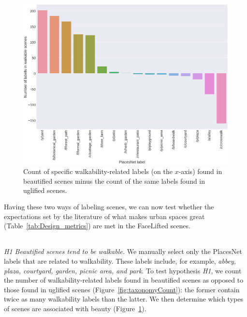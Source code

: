 \begin{figure}[h]
	\centering
	\includegraphics[width=\columnwidth]{Plot/walkable_taxonomy.png}
	\caption{Count of specific walkability-related labels  (on the $x$-axis) found in beautified scenes minus the count of the same labels found in uglified scenes.}
	\label{fig:WalkableTnomy}
\end{figure}


Having these two ways of labeling scenes, we can now test whether the expectations set by the literature of what makes urban spaces great  (Table~\ref{tab:Design_metrics}) are  met in the FaceLifted scenes. 


\mbox{ } \\
\noindent
\emph{H1 Beautified scenes tend to be walkable.}
We manually select only the PlacesNet labels that are related to walkability. These labels include, for example, \textit{abbey, plaza, courtyard, garden, picnic area, \textrm{and} park}. To test hypothesis \emph{H1}, we count the number of walkability-related labels found in beautified scenes as opposed to those found in uglified scenes (Figure~\ref{fig:taxonomyCount}): the former contain twice as many walkability labels than the latter. We then determine which types of scenes are associated with beauty (Figure~\ref{fig:WalkableTnomy}). 


